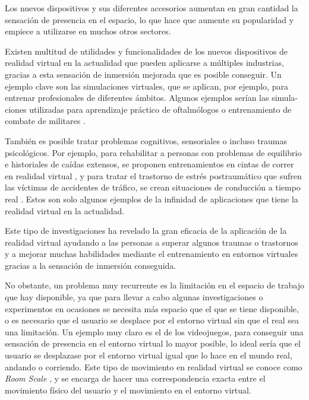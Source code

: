 \documentclass[../main.tex]{subfiles}
\begin{document}
\clearpage
Los nuevos dispositivos y sus diferentes accesorios aumentan en gran cantidad la sensación de presencia en el espacio, lo que hace que aumente su popularidad y empiece a utilizarse en muchos otros sectores.

Existen multitud de utilidades y funcionalidades de los nuevos dispositivos de realidad virtual en la actualidad que pueden aplicarse a múltiples industrias, gracias a esta sensación de inmersión mejorada que es posible conseguir. Un ejemplo clave son las simulaciones virtuales, que se aplican, por ejemplo, para entrenar profesionales de diferentes ámbitos. Algunos ejemplos serían las simula- ciones utilizadas para aprendizaje práctico de oftalmólogos \cite{VR_Oftalmology} o entrenamiento de combate de militares \cite{VR_Military}.

También es posible tratar problemas cognitivos, sensoriales o incluso traumas psicológicos. Por ejemplo, para rehabilitar a personas con problemas de equilibrio e historiales de caídas extensos, se proponen entrenamientos en cintas de correr en realidad virtual \cite{VR_Cognitive}, y para tratar el trastorno de estrés postraumático que sufren las víctimas de accidentes de tráfico, se crean situaciones de conducción a tiempo real \cite{VR_PTSD}. Estos son solo algunos ejemplos de la infinidad de aplicaciones que tiene la realidad virtual en la actualidad.

Este tipo de investigaciones ha revelado la gran eficacia de la aplicación de la realidad virtual ayudando a las personas a superar algunos traumas o trastornos y a mejorar muchas habilidades mediante el entrenamiento en entornos virtuales gracias a la sensación de inmersión conseguida.

No obstante, un problema muy recurrente es la limitación en el espacio de trabajo que hay disponible, ya que para llevar a cabo algunas investigaciones o experimentos en ocasiones se necesita más espacio que el que se tiene disponible, o es necesario que el usuario se desplace por el entorno virtual sin que el real sea una limitación. Un ejemplo muy claro es el de los videojuegos, para conseguir una sensación de presencia en el entorno virtual lo mayor posible, lo ideal sería que el usuario se desplazase por el entorno virtual igual que lo hace en el mundo real, andando o corriendo. Este tipo de movimiento en realidad virtual se conoce como \textit{Room Scale} \cite{RoomScale}, y se encarga de hacer una correspondencia exacta entre el movimiento físico del usuario y el movimiento en el entorno virtual.
\end{document}
